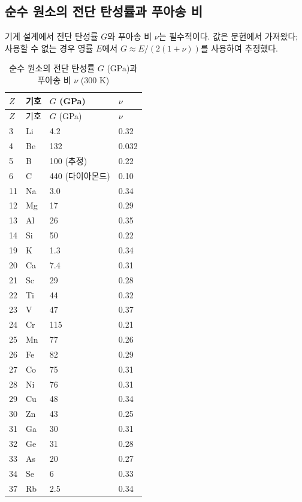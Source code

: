 \documentclass[12pt,a4paper]{article}
\begin{document}
	\subsection{순수 원소의 전단 탄성률과 푸아송 비}
	\label{subsec:elastic-constants}
	
	기계 설계에서 전단 탄성률 \(G\)와 푸아송 비 \(\nu\)는 필수적이다. 값은 문헌에서 가져왔다; 사용할 수 없는 경우 영률 \(E\)에서 \(G \approx E/(2(1+\nu))\)를 사용하여 추정했다.
	
	\begin{longtable}{p{0.6cm}p{1.2cm}p{1.5cm}p{1.5cm}}
		\caption{순수 원소의 전단 탄성률 \(G\) (GPa)과 푸아송 비 \(\nu\) (300 K)} \label{tab:elastic-constants-all} \\
		\toprule
		\(Z\) & 기호 & \(G\) (GPa) & \(\nu\) \\
		\midrule
		\endfirsthead
		\toprule
		\(Z\) & 기호 & \(G\) (GPa) & \(\nu\) \\
		\midrule
		\endhead
		3  & Li & 4.2 & 0.32 \\
		4  & Be & 132 & 0.032 \\
		5  & B  & 100 (추정) & 0.22 \\
		6  & C  & 440 (다이아몬드) & 0.10 \\
		11 & Na & 3.0 & 0.34 \\
		12 & Mg & 17 & 0.29 \\
		13 & Al & 26 & 0.35 \\
		14 & Si & 50 & 0.22 \\
		19 & K  & 1.3 & 0.34 \\
		20 & Ca & 7.4 & 0.31 \\
		21 & Sc & 29 & 0.28 \\
		22 & Ti & 44 & 0.32 \\
		23 & V  & 47 & 0.37 \\
		24 & Cr & 115 & 0.21 \\
		25 & Mn & 77 & 0.26 \\
		26 & Fe & 82 & 0.29 \\
		27 & Co & 75 & 0.31 \\
		28 & Ni & 76 & 0.31 \\
		29 & Cu & 48 & 0.34 \\
		30 & Zn & 43 & 0.25 \\
		31 & Ga & 30 & 0.31 \\
		32 & Ge & 31 & 0.28 \\
		33 & As & 20 & 0.27 \\
		34 & Se & 6 & 0.33 \\
		37 & Rb & 2.5 & 0.34 \\

\end{longtable}
\end{document}
